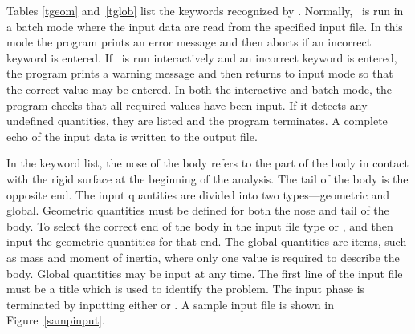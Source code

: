 Tables \ref{tgeom} and~\ref{tglob} list the keywords recognized by
\SLAP. Normally, \SLAP\  is run in a batch mode where the input data are
read from the specified input file.  In this mode the program prints an
error message and then aborts if an incorrect keyword is entered. If
\SLAP\ is run interactively and an incorrect keyword is entered, the
program prints a warning message and then returns to input mode so that
the correct value may be entered.  In both the interactive and batch
mode, the program checks that all required values have been input.  If
it detects any undefined quantities, they are listed and the program
terminates. A complete echo of the input data is written to the output
file.

In the keyword list, the nose of the body refers to the part
of the body in contact with the rigid surface at the beginning of the
analysis. The tail of the body is the opposite end.  The input
quantities are divided into two types---geometric and global.
Geometric quantities must be defined for both the nose and tail of the
body. To select the correct end of the body in the input file type
 or , and then input the geometric quantities for
that end.  The global quantities are items, such as mass and moment of
inertia, where only one value is required to describe the body.  Global
quantities may be input at any time.  The first line of the input file
must be a title which is used to identify the problem.  The input phase
is terminated by inputting either  or .  A sample
input file is shown in Figure~\ref{sampinput}.
